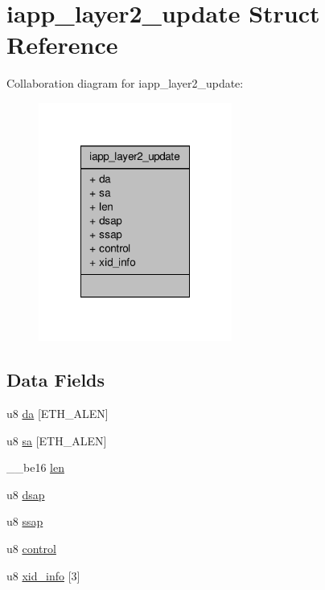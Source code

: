 \hypertarget{structiapp__layer2__update}{\section{iapp\-\_\-layer2\-\_\-update Struct Reference}
\label{structiapp__layer2__update}
}


Collaboration diagram for iapp\-\_\-layer2\-\_\-update\-:
\nopagebreak
\begin{figure}[H]
\begin{center}
\leavevmode
\includegraphics[width=180pt]{structiapp__layer2__update__coll__graph}
\end{center}
\end{figure}
\subsection*{Data Fields}
\begin{DoxyCompactItemize}
\item 
u8 \hyperlink{structiapp__layer2__update_ab5293261358b59532e274da4e90cd5d9}{da} \mbox{[}E\-T\-H\-\_\-\-A\-L\-E\-N\mbox{]}
\item 
u8 \hyperlink{structiapp__layer2__update_a1d248d85a9aee0de13f6a2647297e517}{sa} \mbox{[}E\-T\-H\-\_\-\-A\-L\-E\-N\mbox{]}
\item 
\-\_\-\-\_\-be16 \hyperlink{structiapp__layer2__update_a52677ab565a13bf20b2a616ead6934d7}{len}
\item 
u8 \hyperlink{structiapp__layer2__update_a41da1e30acc545368f8fd4486b8ddde0}{dsap}
\item 
u8 \hyperlink{structiapp__layer2__update_ae78f5fb673d337315fe87a2a4dc04c39}{ssap}
\item 
u8 \hyperlink{structiapp__layer2__update_aa8da087d38de0d260639bbec5c30e1bc}{control}
\item 
u8 \hyperlink{structiapp__layer2__update_ab19e66e83f523eb4706bd46459a44400}{xid\-\_\-info} \mbox{[}3\mbox{]}
\end{DoxyCompactItemize}


